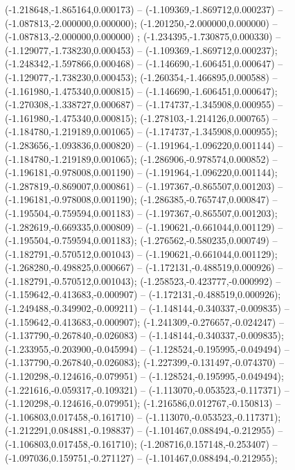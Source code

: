  (-1.218648,-1.865164,0.000173) -- (-1.109369,-1.869712,0.000237) -- (-1.087813,-2.000000,0.000000);
 (-1.201250,-2.000000,0.000000) -- (-1.087813,-2.000000,0.000000) ;
 (-1.234395,-1.730875,0.000330) -- (-1.129077,-1.738230,0.000453) -- (-1.109369,-1.869712,0.000237);
 (-1.248342,-1.597866,0.000468) -- (-1.146690,-1.606451,0.000647) -- (-1.129077,-1.738230,0.000453);
 (-1.260354,-1.466895,0.000588) -- (-1.161980,-1.475340,0.000815) -- (-1.146690,-1.606451,0.000647);
 (-1.270308,-1.338727,0.000687) -- (-1.174737,-1.345908,0.000955) -- (-1.161980,-1.475340,0.000815);
 (-1.278103,-1.214126,0.000765) -- (-1.184780,-1.219189,0.001065) -- (-1.174737,-1.345908,0.000955);
 (-1.283656,-1.093836,0.000820) -- (-1.191964,-1.096220,0.001144) -- (-1.184780,-1.219189,0.001065);
 (-1.286906,-0.978574,0.000852) -- (-1.196181,-0.978008,0.001190) -- (-1.191964,-1.096220,0.001144);
 (-1.287819,-0.869007,0.000861) -- (-1.197367,-0.865507,0.001203) -- (-1.196181,-0.978008,0.001190);
 (-1.286385,-0.765747,0.000847) -- (-1.195504,-0.759594,0.001183) -- (-1.197367,-0.865507,0.001203);
 (-1.282619,-0.669335,0.000809) -- (-1.190621,-0.661044,0.001129) -- (-1.195504,-0.759594,0.001183);
 (-1.276562,-0.580235,0.000749) -- (-1.182791,-0.570512,0.001043) -- (-1.190621,-0.661044,0.001129);
 (-1.268280,-0.498825,0.000667) -- (-1.172131,-0.488519,0.000926) -- (-1.182791,-0.570512,0.001043);
 (-1.258523,-0.423777,-0.000992) -- (-1.159642,-0.413683,-0.000907) -- (-1.172131,-0.488519,0.000926);
 (-1.249488,-0.349902,-0.009211) -- (-1.148144,-0.340337,-0.009835) -- (-1.159642,-0.413683,-0.000907);
 (-1.241309,-0.276657,-0.024247) -- (-1.137790,-0.267840,-0.026083) -- (-1.148144,-0.340337,-0.009835);
 (-1.233955,-0.203900,-0.045994) -- (-1.128524,-0.195995,-0.049494) -- (-1.137790,-0.267840,-0.026083);
 (-1.227399,-0.131497,-0.074370) -- (-1.120298,-0.124616,-0.079951) -- (-1.128524,-0.195995,-0.049494);
 (-1.221616,-0.059317,-0.109321) -- (-1.113070,-0.053523,-0.117371) -- (-1.120298,-0.124616,-0.079951);
 (-1.216586,0.012767,-0.150813) -- (-1.106803,0.017458,-0.161710) -- (-1.113070,-0.053523,-0.117371);
 (-1.212291,0.084881,-0.198837) -- (-1.101467,0.088494,-0.212955) -- (-1.106803,0.017458,-0.161710);
 (-1.208716,0.157148,-0.253407) -- (-1.097036,0.159751,-0.271127) -- (-1.101467,0.088494,-0.212955);
